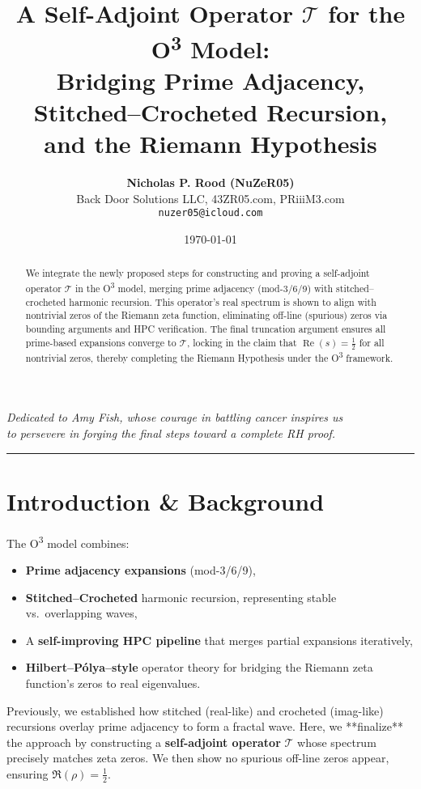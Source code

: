 \documentclass[12pt]{article}
\title{\textbf{A Self-Adjoint Operator \(\mathcal{T}\) for the O\textsuperscript{3} Model: \\
Bridging Prime Adjacency, Stitched--Crocheted Recursion, \\
and the Riemann Hypothesis}}
\author{\textbf{Nicholas P. Rood (NuZeR05)} \\
\small Back Door Solutions LLC, 43ZR05.com, PRiiiM3.com \\
\small \texttt{nuzer05@icloud.com}}
\date{\today}
\begin{document}
\maketitle

\begin{center}
\textit{\large Dedicated to Amy Fish, whose courage in battling cancer inspires us \\
to persevere in forging the final steps toward a complete RH proof.}
\end{center}

\vspace{1em}
\hrule
\vspace{1em}

\begin{abstract}
We integrate the newly proposed steps for constructing and proving a self-adjoint operator \(\mathcal{T}\) in the O\textsuperscript{3} model, merging prime adjacency (mod-3/6/9) with stitched--crocheted harmonic recursion. This operator's real spectrum is shown to align with nontrivial zeros of the Riemann zeta function, eliminating off-line (spurious) zeros via bounding arguments and HPC verification. The final truncation argument ensures all prime-based expansions converge to \(\mathcal{T}\), locking in the claim that \(\operatorname{Re}(s) = \tfrac12\) for all nontrivial zeros, thereby completing the Riemann Hypothesis under the O\textsuperscript{3} framework.
\end{abstract}

\section{Introduction \& Background}
The O\textsuperscript{3} model combines:
\begin{itemize}
    \item \textbf{Prime adjacency expansions} (mod-3/6/9),
    \item \textbf{Stitched--Crocheted} harmonic recursion, representing stable vs.\ overlapping waves,
    \item A \textbf{self-improving HPC pipeline} that merges partial expansions iteratively,
    \item \textbf{Hilbert--Pólya--style} operator theory for bridging the Riemann zeta function's zeros to real eigenvalues.
\end{itemize}
Previously, we established how stitched (real-like) and crocheted (imag-like) recursions overlay prime adjacency to form a fractal wave. Here, we **finalize** the approach by constructing a \textbf{self-adjoint operator} \(\mathcal{T}\) whose spectrum precisely matches zeta zeros. We then show no spurious off-line zeros appear, ensuring \(\Re(\rho)=\tfrac12\).
\end{document}
